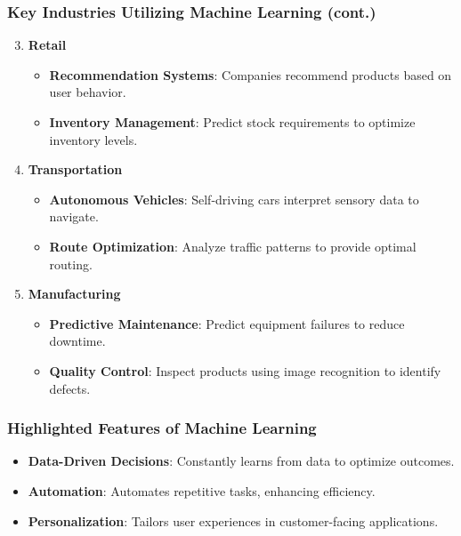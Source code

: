 \documentclass[aspectratio=169]{beamer}
\begin{document}
\begin{frame}[fragile]
    \frametitle{Key Industries Utilizing Machine Learning (cont.)}
    \begin{enumerate}
        \setcounter{enumi}{2}
        \item \textbf{Retail}
            \begin{itemize}
                \item \textbf{Recommendation Systems}: Companies recommend products based on user behavior.
                \item \textbf{Inventory Management}: Predict stock requirements to optimize inventory levels.
            \end{itemize}
        \item \textbf{Transportation}
            \begin{itemize}
                \item \textbf{Autonomous Vehicles}: Self-driving cars interpret sensory data to navigate.
                \item \textbf{Route Optimization}: Analyze traffic patterns to provide optimal routing.
            \end{itemize}
        \item \textbf{Manufacturing}
            \begin{itemize}
                \item \textbf{Predictive Maintenance}: Predict equipment failures to reduce downtime.
                \item \textbf{Quality Control}: Inspect products using image recognition to identify defects.
            \end{itemize}
    \end{enumerate}
\end{frame}

\begin{frame}[fragile]
    \frametitle{Highlighted Features of Machine Learning}
    \begin{itemize}
        \item \textbf{Data-Driven Decisions}: Constantly learns from data to optimize outcomes.
        \item \textbf{Automation}: Automates repetitive tasks, enhancing efficiency.
        \item \textbf{Personalization}: Tailors user experiences in customer-facing applications.
    \end{itemize}
\end{frame}
\end{document}

